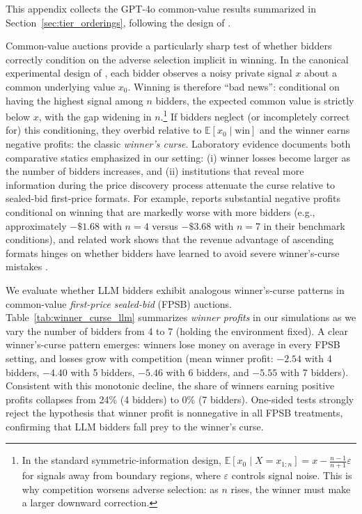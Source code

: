 \documentclass[acmsmall,screen,review]{acmart}
\begin{document}
This appendix collects the GPT-4o common-value results summarized in Section~\ref{sec:tier_orderings}, following the design of \citet{kagel1986winner}.

Common-value auctions provide a particularly sharp test of whether bidders correctly condition on the adverse selection implicit in winning. In the canonical experimental design of \citet{kagel1986winner}, each bidder observes a noisy private signal $x$ about a common underlying value $x_0$. Winning is therefore ``bad news'': conditional on having the highest signal among $n$ bidders, the expected common value is strictly below $x$, with the gap widening in $n$.\footnote{In the standard symmetric-information design, $\mathbb{E}[x_0 \mid X=x_{1:n}] = x - \frac{n-1}{n+1}\varepsilon$ for signals away from boundary regions, where $\varepsilon$ controls signal noise. This is why competition worsens adverse selection: as $n$ rises, the winner must make a larger downward correction.} If bidders neglect (or incompletely correct for) this conditioning, they overbid relative to $\mathbb{E}[x_0\mid \text{win}]$ and the winner earns negative profits: the classic \emph{winner's curse}. Laboratory evidence documents both comparative statics emphasized in our setting: (i) winner losses become larger as the number of bidders increases, and (ii) institutions that reveal more information during the price discovery process attenuate the curse relative to sealed-bid first-price formats. For example, \citet{kagel1986winner} reports substantial negative profits conditional on winning that are markedly worse with more bidders (e.g., approximately $-\$1.68$ with $n=4$ versus $-\$3.68$ with $n=7$ in their benchmark conditions), and related work shows that the revenue advantage of ascending formats hinges on whether bidders have learned to avoid severe winner's-curse mistakes \citep{levin1996revenue}.

We evaluate whether LLM bidders exhibit analogous winner's-curse patterns in common-value \emph{first-price sealed-bid} (FPSB) auctions. Table~\ref{tab:winner_curse_llm} summarizes \emph{winner profits} in our simulations as we vary the number of bidders from 4 to 7 (holding the environment fixed). A clear winner’s-curse pattern emerges: winners lose money on average in every FPSB setting, and losses grow with competition (mean winner profit: $-2.54$ with 4 bidders, $-4.40$ with 5 bidders, $-5.46$ with 6 bidders, and $-5.55$ with 7 bidders). Consistent with this monotonic decline, the share of winners earning positive profits collapses from 24\% (4 bidders) to 0\% (7 bidders). One-sided tests strongly reject the hypothesis that winner profit is nonnegative in all FPSB treatments, confirming that LLM bidders fall prey to the winner’s curse\citep{kagel1986winner}.
\end{document}
